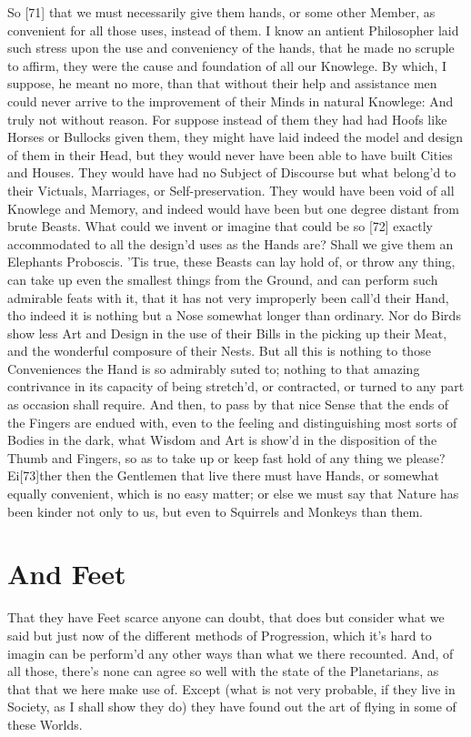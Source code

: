 \documentclass[letterpaper]{book}
\begin{document}
So [71] that we must necessarily give them hands, or some other Member, as
convenient for all those uses, instead of them. I know an antient
Philosopher laid such stress upon the use and conveniency of the hands, that
he made no scruple to affirm, they were the cause and foundation of all our
Knowlege.  By which, I suppose, he meant no more, than that without their
help and assistance men could never arrive to the improvement of their Minds
in natural Knowlege: And truly not without reason. For suppose instead of
them they had had Hoofs like Horses or Bullocks given them, they might have
laid indeed the model and design of them in their Head, but they would never
have been able to have built Cities and Houses. They would have had no
Subject of Discourse but what belong'd to their Victuals, Marriages, or
Self-preservation. They would have been void of all Knowlege and Memory, and
indeed would have been but one degree distant from brute Beasts. What could
we invent or imagine that could be so [72] exactly accommodated to all the
design'd uses as the Hands are? Shall we give them an Elephants Proboscis.
'Tis true, these Beasts can lay hold of, or throw any thing, can take up
even the smallest things from the Ground, and can perform such admirable
feats with it, that it has not very improperly been call'd their Hand, tho
indeed it is nothing but a Nose somewhat longer than ordinary.  Nor do Birds
show less Art and Design in the use of their Bills in the picking up their
Meat, and the wonderful composure of their Nests. But all this is nothing to
those Conveniences the Hand is so admirably suted to; nothing to that
amazing contrivance in its capacity of being stretch'd, or contracted, or
turned to any part as occasion shall require. And then, to pass by that nice
Sense that the ends of the Fingers are endued with, even to the feeling and
distinguishing most sorts of Bodies in the dark, what Wisdom and Art is
show'd in the disposition of the Thumb and Fingers, so as to take up or keep
fast hold of any thing we please? Ei[73]ther then the Gentlemen that live
there must have Hands, or somewhat equally convenient, which is no easy
matter; or else we must say that Nature has been kinder not only to us, but
even to Squirrels and Monkeys than them.


\section{And Feet}

That they have Feet scarce anyone can doubt, that does but consider what we
said but just now of the different methods of Progression, which it's hard
to imagin can be perform'd any other ways than what we there recounted.
And, of all those, there's none can agree so well with the state of the
Planetarians, as that that we here make use of. Except (what is not very
probable, if they live in Society, as I shall show they do) they have found
out the art of flying in some of these Worlds.
\end{document}
